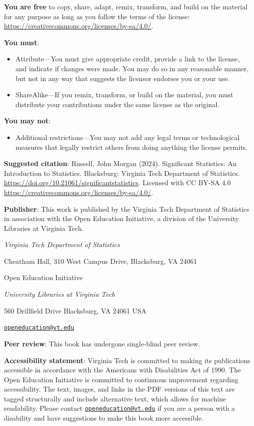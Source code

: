 \documentclass[
  letterpaper,
  DIV=11,
  numbers=noendperiod]{scrreprt}
\providecommand{\tightlist}{%
  \setlength{\itemsep}{0pt}\setlength{\parskip}{0pt}}\usepackage{longtable,booktabs,array}
\theoremstyle{definition}
\theoremstyle{remark}
\begin{document}
\textbf{You are free} to copy, share, adapt, remix, transform, and build
on the material for any purpose as long as you follow the terms of the
license: \url{https://creativecommons.org/licenses/by-sa/4.0/}.

\textbf{You must}:

\begin{itemize}
\item
  Attribute---You must give appropriate credit, provide a link to the
  license, and indicate if changes were made. You may do so in any
  reasonable manner, but not in any way that suggests the licensor
  endorses you or your use.
\item
  ShareAlike---If you remix, transform, or build on the material, you
  must distribute your contributions under the same license as the
  original.
\end{itemize}

\textbf{You may not}:

\begin{itemize}
\tightlist
\item
  Additional restrictions---You may not add any legal terms or
  technological measures that legally restrict others from doing
  anything the license permits.
\end{itemize}

\textbf{Suggested citation}: Russell, John Morgan (2024). Significant
Statistics: An Introduction to Statistics. Blacksburg: Virginia Tech
Department of Statistics.
\url{https://doi.org/10.21061/significantstatistics}. Licensed with CC
BY-SA 4.0 \url{https://creativecommons.org/licenses/by-sa/4.0/}.

\textbf{Publisher}: This work is published by the Virginia Tech
Department of Statistics in association with the Open Education
Initiative, a division of the University Libraries at Virginia Tech.

\emph{Virginia Tech Department of Statistics}

Cheatham Hall, 310 West Campus Drive, Blacksburg, VA 24061

Open Education Initiative

\emph{University Libraries at Virginia Tech}

560 Drillfield Drive Blacksburg, VA 24061 USA

\href{mailto:openeducation@vt.edu}{\nolinkurl{openeducation@vt.edu}}

\textbf{Peer review}: This book has undergone single-blind peer review.

\textbf{Accessibility statement}: Virginia Tech is committed to making
its publications accessible in accordance with the Americans with
Disabilities Act of 1990. The Open Education Initiative is committed to
continuous improvement regarding accessibility. The text, images, and
links in the PDF versions of this text are tagged structurally and
include alternative text, which allows for machine readability. Please
contact
\href{mailto:openeducation@vt.edu}{\nolinkurl{openeducation@vt.edu}} if
you are a person with a disability and have suggestions to make this
book more accessible.
\end{document}
